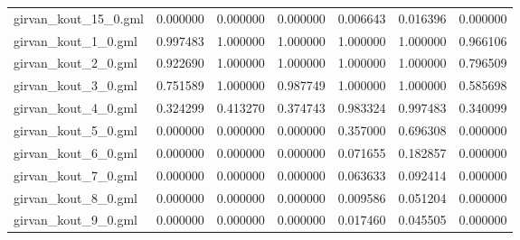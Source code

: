 \begin{tabular}{lrrrrrr}
girvan\_kout\_15\_0.gml       &                            0.000000 &                       0.000000 &                          0.000000 &                      0.006643 &                        0.016396 &                                0.000000 \\
girvan\_kout\_1\_0.gml        &                            0.997483 &                       1.000000 &                          1.000000 &                      1.000000 &                        1.000000 &                                0.966106 \\
girvan\_kout\_2\_0.gml        &                            0.922690 &                       1.000000 &                          1.000000 &                      1.000000 &                        1.000000 &                                0.796509 \\
girvan\_kout\_3\_0.gml        &                            0.751589 &                       1.000000 &                          0.987749 &                      1.000000 &                        1.000000 &                                0.585698 \\
girvan\_kout\_4\_0.gml        &                            0.324299 &                       0.413270 &                          0.374743 &                      0.983324 &                        0.997483 &                                0.340099 \\
girvan\_kout\_5\_0.gml        &                            0.000000 &                       0.000000 &                          0.000000 &                      0.357000 &                        0.696308 &                                0.000000 \\
girvan\_kout\_6\_0.gml        &                            0.000000 &                       0.000000 &                          0.000000 &                      0.071655 &                        0.182857 &                                0.000000 \\
girvan\_kout\_7\_0.gml        &                            0.000000 &                       0.000000 &                          0.000000 &                      0.063633 &                        0.092414 &                                0.000000 \\
girvan\_kout\_8\_0.gml        &                            0.000000 &                       0.000000 &                          0.000000 &                      0.009586 &                        0.051204 &                                0.000000 \\
girvan\_kout\_9\_0.gml        &                            0.000000 &                       0.000000 &                          0.000000 &                      0.017460 &                        0.045505 &                                0.000000 \\

\end{tabular}
